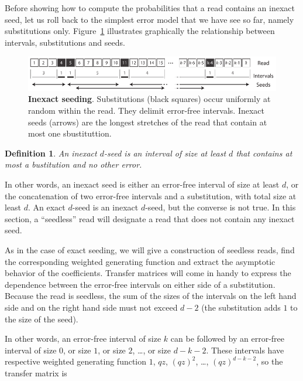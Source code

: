 \documentclass{article}
\newtheorem{definition}{Definition}
\begin{document}
Before showing how to compute the probabilities that a read contains
an inexact seed, let us roll back to the simplest error model that we have
see so far, namely substitutions only. Figure~\ref{fig:sketchinexact}
illustrates graphically the relationship between intervals, substitutions
and seeds.

\begin{figure}[h]
\centering
\includegraphics[scale=0.88]{sketch_inexact_seeding.pdf}
\caption{\textbf{Inexact seeding}. Substitutions (black squares) occur
uniformly at random within the read. They delimit error-free intervals.
Inexact seeds (arrows) are the longest stretches of the read that contain
at most one sbustituttion.}
\label{fig:sketchinexact}
\end{figure}


\begin{definition}
\label{def:seed}
An inexact $d$-seed is an interval of size at least $d$ that contains at
most a bustitution and no other error.
\end{definition}

In other words, an inexact seed is either an error-free interval of size
at least $d$, or the concatenation of two error-free intervals and a
substitution, with total size at least $d$. An exact $d$-seed is an
inexact $d$-seed, but the converse is not true. In this section, a
``seedless'' read will designate a read that does not contain any inexact
seed.

As in the case of exact seeding, we will give a construction of seedless
reads, find the corresponding weighted generating function and extract the
asymptotic behavior of the coefficients. Transfer matrices will come in
handy to express the dependence between the error-free intervals on either
side of a substitution. Because the read is seedless, the sum of the sizes
of the intervals on the left hand side and on the right hand side must not
exceed $d-2$ (the substitution adds $1$ to the size of the seed).

In other words, an error-free interval of size $k$ can be followed by an
error-free interval of size $0$, or size $1$, or size $2$, \ldots, or size
$d-k-2$. These intervals have respective weighted generating function $1$,
$qz$, $(qz)^2$, \ldots, $(qz)^{d-k-2}$, so the transfer matrix is
\end{document}
